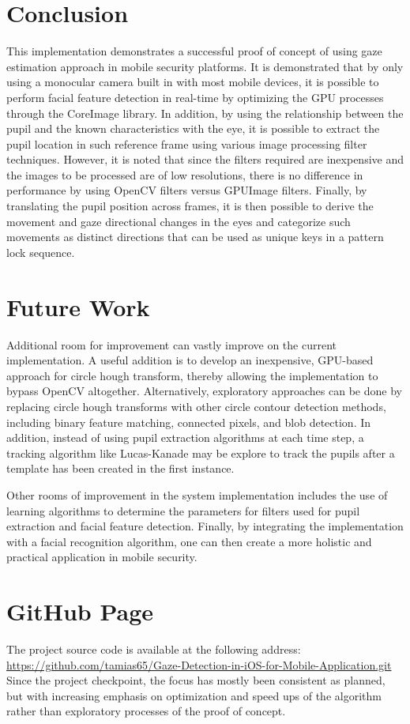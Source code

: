 \documentclass[10pt,twocolumn,letterpaper]{article}
\begin{document}
\section{Conclusion}
This implementation demonstrates a successful proof of concept of using gaze estimation approach in mobile security platforms.  It is demonstrated that by only using a monocular camera built in with most mobile devices, it is possible to perform facial feature detection in real-time by optimizing the GPU processes through the CoreImage library.  In addition, by using the relationship between the pupil and the known characteristics with the eye, it is possible to extract the pupil location in such reference frame using various image processing filter techniques.  However, it is noted that since the filters required are inexpensive and the images to be processed are of low resolutions, there is no difference in performance by using OpenCV filters versus GPUImage filters.   Finally, by translating the pupil position across frames, it is then possible to derive the movement and gaze directional changes in the eyes and categorize such movements as distinct directions that can be used as unique keys in a pattern lock sequence. 
\balance
\section{Future Work}
Additional room for improvement can vastly improve on the current implementation.  A useful addition is to develop an inexpensive, GPU-based approach for circle hough transform, thereby allowing the implementation to bypass OpenCV altogether.  Alternatively, exploratory approaches can be done by replacing circle hough transforms with other circle contour detection methods, including binary feature matching, connected pixels, and blob detection.  In addition, instead of using pupil extraction algorithms at each time step, a tracking algorithm like Lucas-Kanade may be explore to track the pupils after a template has been created in the first instance.

Other rooms of improvement in the system implementation includes the use of learning algorithms to determine the parameters for filters used for pupil extraction and facial feature detection.  Finally, by integrating the implementation with a facial recognition algorithm, one can then create a more holistic and practical application in mobile security.

\section{GitHub Page}
The project source code is available at the following address: \url{https://github.com/tamias65/Gaze-Detection-in-iOS-for-Mobile-Application.git}
Since the project checkpoint, the focus has mostly been consistent as planned, but with increasing emphasis on optimization and speed ups of the algorithm rather than exploratory processes of the proof of concept.

{\small


}
\end{document}
